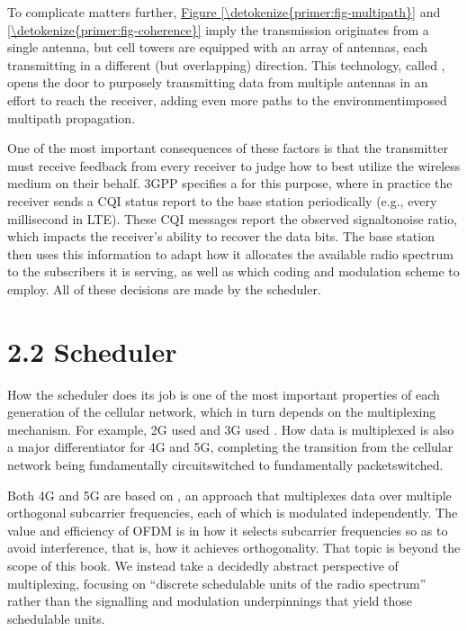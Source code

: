 \documentclass[a4paper,11pt,english]{sphinxmanual}
\begin{document}
\sphinxAtStartPar
To complicate matters further,
\hyperref[\detokenize{primer:fig-multipath}]{Figure \ref{\detokenize{primer:fig-multipath}}} and \hyperref[\detokenize{primer:fig-coherence}]{\ref{\detokenize{primer:fig-coherence}}} imply
the transmission originates from a single
antenna, but cell towers are equipped with an array of antennas, each
transmitting in a different (but overlapping) direction. This
technology, called , opens the
door to purposely transmitting data from multiple antennas in an effort
to reach the receiver, adding even more paths to the environment\sphinxhyphen{}imposed
multipath propagation.

\sphinxAtStartPar
One of the most important consequences of these factors is that the
transmitter must receive feedback from every receiver to judge how to
best utilize the wireless medium on their behalf. 3GPP specifies a
 for this purpose, where in practice
the receiver sends a CQI status report to the base station periodically
(e.g., every millisecond in LTE). These CQI messages report the observed
signal\sphinxhyphen{}to\sphinxhyphen{}noise ratio, which impacts the receiver’s ability to recover
the data bits. The base station then uses this information to adapt how
it allocates the available radio spectrum to the subscribers it is
serving, as well as which coding and modulation scheme to employ.
All of these decisions are made by the scheduler.


\section{2.2 Scheduler}
\label{\detokenize{primer:scheduler}}
\sphinxAtStartPar
How the scheduler does its job is one of the most important properties
of each generation of the cellular network, which in turn depends on
the multiplexing mechanism. For example, 2G used  and 3G used . How data is multiplexed is also a major differentiator for 4G
and 5G, completing the transition from the cellular network being
fundamentally circuit\sphinxhyphen{}switched to fundamentally packet\sphinxhyphen{}switched.

\sphinxAtStartPar
Both 4G and 5G are based on , an approach that multiplexes data over multiple
orthogonal subcarrier frequencies, each of which is modulated
independently. The value and efficiency of OFDM is in how it selects
subcarrier frequencies so as to avoid interference, that is, how it
achieves orthogonality. That topic is beyond the scope of this book.
We instead take a decidedly abstract perspective of multiplexing,
focusing on “discrete schedulable units of the radio spectrum” rather
than the signalling and modulation underpinnings that yield those
schedulable units.
\end{document}
